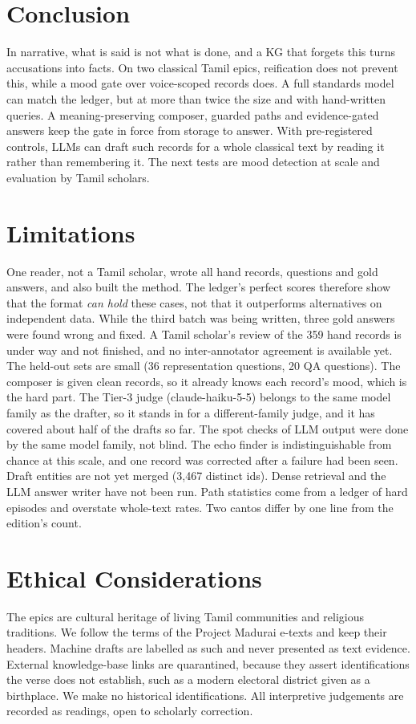 \documentclass[11pt]{article}
\begin{document}
\section{Conclusion}
In narrative, what is said is not what is done, and a KG that forgets this turns accusations into facts. On two classical Tamil epics, reification does not prevent this, while a mood gate over voice-scoped records does. A full standards model can match the ledger, but at more than twice the size and with hand-written queries. A meaning-preserving composer, guarded paths and evidence-gated answers keep the gate in force from storage to answer. With pre-registered controls, LLMs can draft such records for a whole classical text by reading it rather than remembering it. The next tests are mood detection at scale and evaluation by Tamil scholars.

\section*{Limitations}
One reader, not a Tamil scholar, wrote all hand records, questions and gold answers, and also built the method. The ledger's perfect scores therefore show that the format \emph{can hold} these cases, not that it outperforms alternatives on independent data. While the third batch was being written, three gold answers were found wrong and fixed. A Tamil scholar's review of the 359 hand records is under way and not finished, and no inter-annotator agreement is available yet. The held-out sets are small (36 representation questions, 20 QA questions). The composer is given clean records, so it already knows each record's mood, which is the hard part. The Tier-3 judge (claude-haiku-5-5) belongs to the same model family as the drafter, so it stands in for a different-family judge, and it has covered about half of the drafts so far. The spot checks of LLM output were done by the same model family, not blind. The echo finder is indistinguishable from chance at this scale, and one record was corrected after a failure had been seen. Draft entities are not yet merged (3,467 distinct ids). Dense retrieval and the LLM answer writer have not been run. Path statistics come from a ledger of hard episodes and overstate whole-text rates. Two cantos differ by one line from the edition's count.

\section*{Ethical Considerations}
The epics are cultural heritage of living Tamil communities and religious traditions. We follow the terms of the Project Madurai e-texts and keep their headers. Machine drafts are labelled as such and never presented as text evidence. External knowledge-base links are quarantined, because they assert identifications the verse does not establish, such as a modern electoral district given as a birthplace. We make no historical identifications. All interpretive judgements are recorded as readings, open to scholarly correction.
\end{document}
